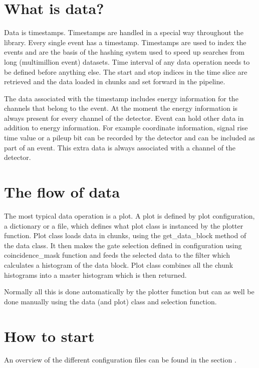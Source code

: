 \documentclass[letterpaper,10pt,english]{sphinxmanual}
\begin{document}
\section{What is data?}
\label{\detokenize{manual/manual:what-is-data}}
\sphinxAtStartPar
Data is timestamps. Timestamps are handled in a special way throughout the library. Every single
event has a timestamp. Timestamps are used to index the events and are the basis of the hashing
system used to speed up searches from long (multi\sphinxhyphen{}million event) datasets. Time interval of any
data operation needs to be defined before anything else. The start and stop indices in the time
slice are retrieved and the data loaded in chunks and set forward in the pipeline.

\sphinxAtStartPar
The data associated with the timestamp includes energy information for the channels that belong
to the event. At the moment the energy information is always present for every channel of the detector. Event can hold
other data in addition to energy information. For example coordinate information, signal rise time
value or a pile\sphinxhyphen{}up bit can be recorded by the detector and can be included as part of an event. This
extra data is always associated with a channel of the detector.


\section{The flow of data}
\label{\detokenize{manual/manual:the-flow-of-data}}
\sphinxAtStartPar
The most typical data operation is a plot. A plot is defined by plot configuration, a dictionary
or a file, which defines what plot class is instanced by the plotter function. Plot class loads
data in chunks, using the get\_data\_block method of the data class. It then makes the gate
selection defined in configuration using coincidence\_mask function and feeds the selected data to
the filter which calculates a histogram of the data block. Plot class combines all the chunk
histograms into a master histogram which is then returned.

\sphinxAtStartPar
Normally all this is done automatically by the plotter function but can as well be done manually
using the data (and plot) class and selection function.


\section{How to start}
\label{\detokenize{manual/manual:how-to-start}}
\sphinxAtStartPar
An overview of the different configuration files can be found in the section {\hyperref[\detokenize{manual/configuration:configuration}]{}}.
\end{document}

